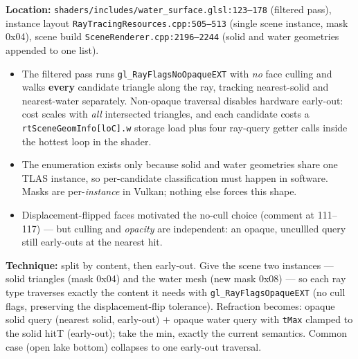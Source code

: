 \documentclass[11pt,a4paper]{article}
\begin{document}
\textbf{Location:} \texttt{shaders/includes/water\_surface.glsl:123--178} (filtered pass), instance layout \texttt{RayTracingResources.cpp:505--513} (single scene instance, mask 0x04), scene build \texttt{SceneRenderer.cpp:2196--2244} (solid and water geometries appended to one list).

\begin{itemize}
    \item The filtered pass runs \texttt{gl\_RayFlagsNoOpaqueEXT} with \emph{no} face culling and walks \textbf{every} candidate triangle along the ray, tracking nearest-solid and nearest-water separately. Non-opaque traversal disables hardware early-out: cost scales with \emph{all} intersected triangles, and each candidate costs a \texttt{rtSceneGeomInfo[loC].w} storage load plus four ray-query getter calls inside the hottest loop in the shader.
    \item The enumeration exists only because solid and water geometries share one TLAS instance, so per-candidate classification must happen in software. Masks are per-\emph{instance} in Vulkan; nothing else forces this shape.
    \item Displacement-flipped faces motivated the no-cull choice (comment at 111--117) --- but culling and \emph{opacity} are independent: an opaque, uncullled query still early-outs at the nearest hit.
\end{itemize}

\textbf{Technique:} split by content, then early-out. Give the scene two instances --- solid triangles (mask 0x04) and the water mesh (new mask 0x08) --- so each ray type traverses exactly the content it needs with \texttt{gl\_RayFlagsOpaqueEXT} (no cull flags, preserving the displacement-flip tolerance). Refraction becomes: opaque solid query (nearest solid, early-out) $+$ opaque water query with \texttt{tMax} clamped to the solid hitT (early-out); take the min, exactly the current semantics. Common case (open lake bottom) collapses to one early-out traversal.
\end{document}
